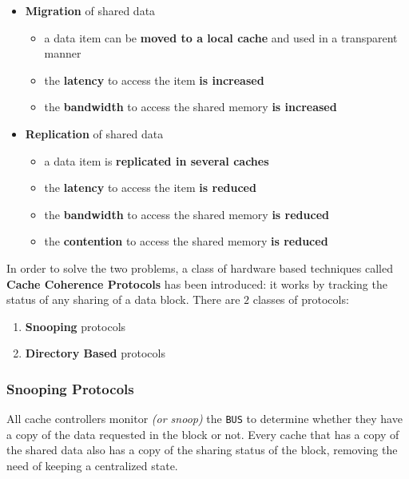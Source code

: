 \documentclass[english]{article}
\begin{document}
\begin{itemize}
  \item \textbf{Migration} of shared data
        \begin{itemize}
          \item a data item can be \textbf{moved to a local cache} and used in a transparent manner
          \item the \textbf{latency} to access the item \textbf{is increased}
          \item the \textbf{bandwidth} to access the shared memory \textbf{is increased}
        \end{itemize}
  \item \textbf{Replication} of shared data
        \begin{itemize}
          \item a data item is \textbf{replicated in several caches}
          \item the \textbf{latency} to access the item \textbf{is reduced}
          \item the \textbf{bandwidth} to access the shared memory \textbf{is reduced}
          \item the \textbf{contention} to access the shared memory \textbf{is reduced}
        \end{itemize}
\end{itemize}

In order to solve the two problems, a class of hardware based techniques called \textbf{Cache Coherence Protocols} has been introduced:
it works by tracking the status of any sharing of a data block.
There are \(2\) classes of protocols:

\begin{enumerate}
  \item \textbf{Snooping} protocols
  \item \textbf{Directory Based} protocols
\end{enumerate}

\subsubsection{Snooping Protocols}

All cache controllers monitor \textit{(or snoop)} the \texttt{BUS} to determine whether they have a copy of the data requested in the block or not.
Every cache that has a copy of the shared data also has a copy of the sharing status of the block, removing the need of keeping a centralized state.
\end{document}
